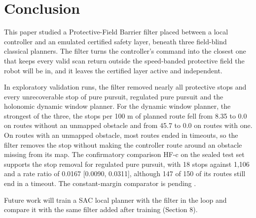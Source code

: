 \section{Conclusion}

This paper studied a Protective-Field Barrier filter placed between a local controller and an emulated certified safety layer, beneath three field-blind classical planners. The filter turns the controller's command into the closest one that keeps every valid scan return outside the speed-banded protective field the robot will be in, and it leaves the certified layer active and independent.

In exploratory validation runs, the filter removed nearly all protective stops and every unrecoverable stop of pure pursuit, regulated pure pursuit and the holonomic dynamic window planner. For the dynamic window planner, the strongest of the three, the stops per 100 m of planned route fell from 8.35 to 0.0 on routes without an unmapped obstacle and from 45.7 to 0.0 on routes with one. On routes with an unmapped obstacle, most routes ended in timeouts, so the filter removes the stop without making the controller route around an obstacle missing from its map. The confirmatory comparison HF-c on the sealed test set supports the stop removal for regulated pure pursuit, with 18 stops against 1,106 and a rate ratio of 0.0167 [0.0090, 0.0311], although 147 of 150 of its routes still end in a timeout. The constant-margin comparator is pending .

Future work will train a SAC local planner with the filter in the loop and compare it with the same filter added after training (Section 8).
